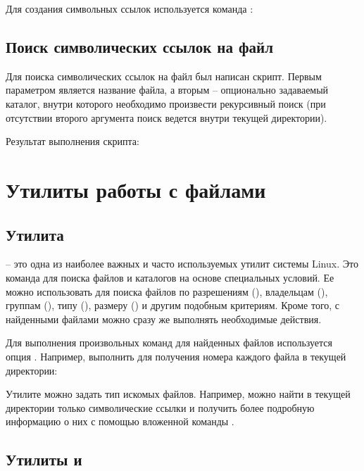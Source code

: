 Для создания символьных ссылок используется команда :


\subsection{Поиск символических ссылок на файл}

Для поиска символических ссылок на файл был написан скрипт. Первым параметром является название файла, а вторым -- опционально задаваемый каталог, внутри которого необходимо произвести рекурсивный поиск (при отсутствии второго аргумента поиск ведется внутри текущей директории).


Результат выполнения скрипта:


\section{Утилиты работы с файлами}

\subsection{Утилита }

 -- это одна из наиболее важных и часто используемых утилит системы Linux. Это команда для поиска файлов и каталогов на основе специальных условий. Ее можно использовать для поиска файлов по разрешениям (), владельцам (), группам (), типу (), размеру () и другим подобным критериям. Кроме того, с найденными файлами можно сразу же выполнять необходимые действия.

Для выполнения произвольных команд для найденных файлов используется опция . Например, выполнить  для получения номера  каждого файла в текущей директории:


Утилите  можно задать тип искомых файлов. Например, можно найти в текущей директории только символические ссылки и получить более подробную информацию о них с помощью вложенной команды .


\subsection{Утилиты  и }

